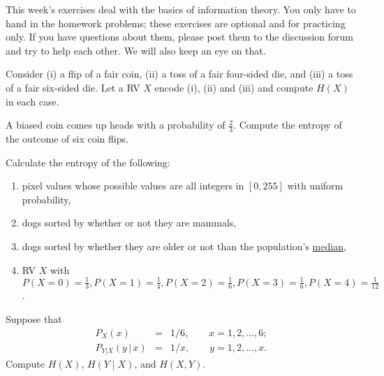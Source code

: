 \documentclass[a4paper,10pt,landscape,twocolumn]{scrartcl}
\begin{document}
\practiceproblems

{\sffamily\noindent
This week's exercises deal with the basics of information theory. You only have to hand in the homework problems; these exercises are optional and for practicing only. If you have questions about them, please post them to the discussion forum and try to help each other. We will also keep an eye on that.
}

\begin{exercise}[entropies]
Consider (i) a flip of a fair coin, (ii) a toss of a fair four-sided die, and (iii) a toss of a fair six-sided die. Let a RV $X$ encode (i), (ii) and (iii) and compute $H(X)$ in each case.
\end{exercise}

\begin{exercise}
A biased coin comes up heads with a probability of $\frac{2}{3}$. Compute the entropy of the outcome of six coin flips.
\end{exercise}

\begin{exercise}
Calculate the entropy of the following:
\begin{enumerate}
\item pixel values whose possible values are all integers in $[0,255]$ with uniform probability, 
\item dogs sorted by whether or not they are mammals, 
\item dogs sorted by whether they are older or not than the population's \href{https://en.wikipedia.org/wiki/Median}{median}, 
\item RV $X$ with $P(X = 0) = \frac{1}{3}, P(X = 1) = \frac{1}{4}, P(X = 2) = \frac{1}{6}, P(X = 3) = \frac{1}{6}, P(X = 4) = \frac{1}{12}$.
\end{enumerate}
\end{exercise}

\begin{exercise}
Suppose that
\begin{eqnarray*}
P_{X}(x) & = & 1/6,\qquad x=1,2,\ldots,6;\\
P_{Y|X}(y\,|\, x) & = & 1/x,\qquad y=1,2,\ldots,x.
\end{eqnarray*}
Compute $H(X)$, $H(Y \mid X)$, and $H(X,Y)$.
\end{exercise}

\vfill
{}
\end{document}
